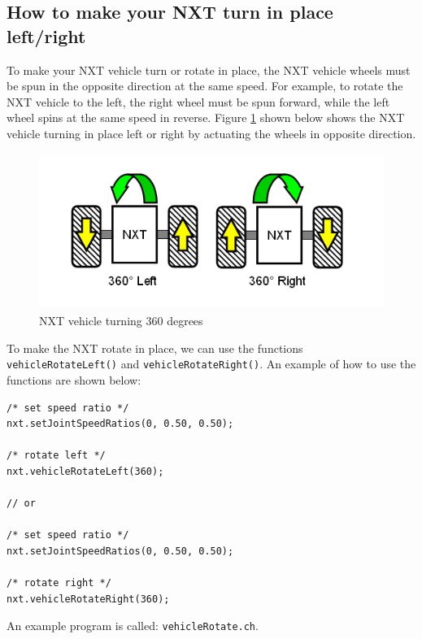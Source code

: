 \documentclass[11pt]{article}
\begin{document}
\subsection{How to make your NXT turn in place left/right}

To make your NXT vehicle turn or rotate in place, the NXT vehicle wheels must be spun in the opposite
direction at the same speed. For example, to rotate the NXT vehicle to the left, the right wheel must
be spun forward, while the left wheel spins at the same speed in reverse. Figure \ref{fig_NXT_360LR} 
shown below shows the NXT vehicle turning in place left or right by actuating the wheels in opposite 
direction.\\
\begin{figure}[h]
  \begin{center}
    \includegraphics[height=2in]{figure/mindstorm/Vehicle_360LR.png}
    \caption{NXT vehicle turning 360 degrees \label{fig_NXT_360LR}}
  \end{center}
\end{figure}

\noindent
To make the NXT rotate in place, we can use the functions \verb+vehicleRotateLeft()+ 
and \verb+vehicleRotateRight()+. An example of how to use the functions are shown below:
\begin{verbatim}
/* set speed ratio */
nxt.setJointSpeedRatios(0, 0.50, 0.50);
    
/* rotate left */
nxt.vehicleRotateLeft(360);

// or
    
/* set speed ratio */
nxt.setJointSpeedRatios(0, 0.50, 0.50);

/* rotate right */
nxt.vehicleRotateRight(360);
\end{verbatim}
\noindent
An example program is called: \verb+vehicleRotate.ch+.

\end{document}
